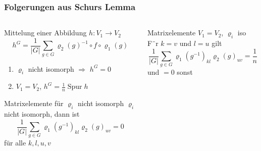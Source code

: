 %
%
%
\bgroup
\begin{frame}[t]
\setlength{\abovedisplayskip}{5pt}
\setlength{\belowdisplayskip}{5pt}
\frametitle{Folgerungen aus Schurs Lemma}
\vspace{-20pt}
\begin{columns}[t,onlytextwidth]
\begin{column}{0.48\textwidth}
\begin{block}{Mittelung einer Abbildung}
$h\colon V_1\to V_2$
\[
h^G = \frac{1}{|G|} \sum_{g\in G} \varrho_2(g)^{-1} \circ f \circ \varrho_1(g)
\]
\begin{enumerate}
\item $\varrho_i$ nicht isomorph $\Rightarrow$ $h^G=0$
\item $V_1=V_2$, $h^G = \frac1n\operatorname{Spur}h$
\end{enumerate}
\end{block}
\begin{block}{Matrixelemente für $\varrho_i$ nicht isomorph}
$\varrho_i$ nicht isomorph, dann ist
\[
\frac{1}{|G|} \sum_{g\in G} \varrho_1(g^{-1})_{kl}\varrho_2(g)_{uv}=0
\]
für alle $k,l,u,v$
\end{block}
\end{column}
\begin{column}{0.48\textwidth}
\begin{block}{Matrixelemente $V_1=V_2$, $\varrho_i$ iso}
F¨r $k=v$ und $l=u$  gilt
\[
\frac{1}{|G|} \sum_{g\in G} \varrho_1(g^{-1})_{kl} \varrho_2(g)_{uv}
=
\frac1n
\]
und $=0$ sonst
\end{block}
\end{column}
\end{columns}
\end{frame}
\egroup
